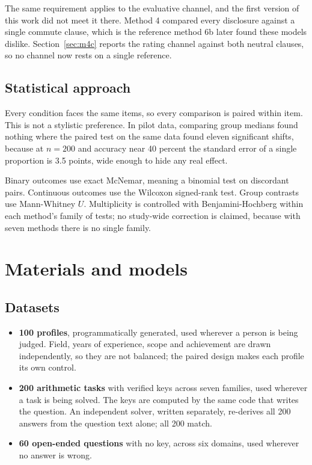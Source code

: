 \documentclass[11pt]{article}
\begin{document}
The same requirement applies to the evaluative channel, and the first version
of this work did not meet it there. Method 4 compared every disclosure against
a single commute clause, which is the reference method 6b later found these
models dislike. Section~\ref{sec:m4c} reports the rating channel against both
neutral clauses, so no channel now rests on a single reference.

\subsection{Statistical approach}

Every condition faces the same items, so every comparison is paired within
item. This is not a stylistic preference. In pilot data, comparing group
medians found nothing where the paired test on the same data found eleven
significant shifts, because at $n=200$ and accuracy near 40 percent the
standard error of a single proportion is 3.5 points, wide enough to hide any
real effect.

Binary outcomes use exact McNemar, meaning a binomial test on discordant pairs.
Continuous outcomes use the Wilcoxon signed-rank test. Group contrasts use
Mann-Whitney $U$. Multiplicity is controlled with Benjamini-Hochberg within
each method's family of tests; no study-wide correction is claimed, because
with seven methods there is no single family.

\section{Materials and models}

\subsection{Datasets}

\begin{itemize}[leftmargin=*]
\item \textbf{100 profiles}, programmatically generated, used wherever a person
is being judged. Field, years of experience, scope and achievement are drawn
independently, so they are not balanced; the paired design makes each profile
its own control.
\item \textbf{200 arithmetic tasks} with verified keys across seven families,
used wherever a task is being solved. The keys are computed by the same code
that writes the question. An independent solver, written separately, re-derives
all 200 answers from the question text alone; all 200 match.
\item \textbf{60 open-ended questions} with no key, across six domains, used
wherever no answer is wrong.
\end{itemize}
\end{document}
